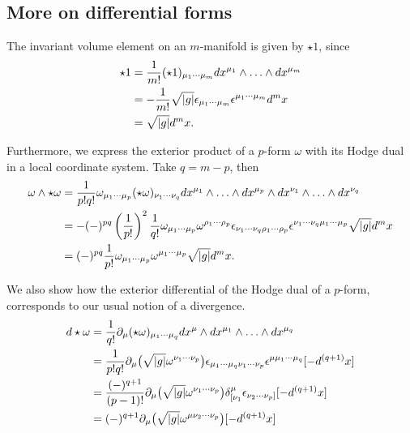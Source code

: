 \documentclass[12pt,twoside]{book}
\begin{document}
\begin{appendices}
\section{More on differential forms}\label{app:expl-calc}

The invariant volume element on an $m$-manifold is given by $\star 1$, since
\begin{align}
\star 1& = \frac{1}{m!}(\star 1)_{\mu_{1}\cdots\mu_{m}}dx^{\mu_{1}}\wedge \ldots \wedge dx^{\mu_{m}} \notag\\
& = - \frac{1}{m!}\sqrt{|g|} \epsilon_{\mu_{1}\cdots\mu_{m}}\epsilon^{\mu_{1}\cdots\mu_{m}}d^{m}x \notag\\
& = \sqrt{|g|} d^{m}x.
\end{align}

Furthermore, we express the exterior product of a $p$-form $\omega$ with its Hodge dual in a local coordinate system. Take $q = m-p$, then
\begin{align}
\omega \wedge \star\omega
&= \frac{1}{p!q!}\omega_{\mu_{1}\cdots\mu_{p}}(\star\omega)_{\nu_{1}\cdots\nu_{q}}dx^{\mu_{1}}\wedge \ldots \wedge dx^{\mu_{p}}\wedge dx^{\nu_{1}}\wedge \ldots \wedge dx^{\nu_{q}} \notag\\
&= -(-)^{pq} \left(\frac{1}{p!}\right)^{2} \frac{1}{q!} \omega_{\mu_{1}\cdots\mu_{p}} \omega^{\rho_{1}\cdots\rho_{p}}
\epsilon_{\nu_{1}\cdots\nu_{q}\rho_{1}\cdots\rho_{p}}\epsilon^{\nu_{1}\cdots\nu_{q}\mu_{1}\cdots\mu_{p}}
\sqrt{|g|}d^{m}x \notag\\
&= (-)^{pq}\frac{1}{p!}\omega_{\mu_{1}\cdots\mu_{p}} \omega^{\mu_{1}\cdots\mu_{p}}\sqrt{|g|}d^{m}x.
\end{align}

We also show how the exterior differential of the Hodge dual of a $p$-form, corresponds to our usual notion of a divergence.
\begin{align}
d \star \omega 
&= \frac{1}{q!} \partial_{\mu} (\star \omega)_{\mu_{1} \cdots \mu_{q}} dx^{\mu} \wedge
dx^{\mu_{1}} \wedge \ldots \wedge dx^{\mu_{q}} \notag\\
&= \frac{1}{p!q!} \partial_{\mu} \big( \sqrt{|g|} \omega^{\nu_{1} \cdots \nu_{p}} \big)
\epsilon_{\mu_{1} \cdots \mu_{q} \nu_{1} \cdots \nu_{p}} \epsilon^{\mu \mu_{1} \cdots \mu_{q}} [- d^{(q+1)}x] \notag\\
&= \frac{(-)^{q+1}}{(p-1)!} \partial_{\mu} \big( \sqrt{|g|} \omega^{\nu_{1} \cdots \nu_{p}} \big)
\delta^{\mu}_{[\nu_{1}} \epsilon_{\nu_{2} \cdots \nu_{p} ]} [- d^{(q+1)}x] \notag\\
&= (-)^{q+1} \partial_{\mu} \big( \sqrt{|g|} \omega^{\mu \nu_{2} \cdots \nu_{p}} \big) [- d^{(q+1)}x]
\end{align}


\end{appendices}
\end{document}
